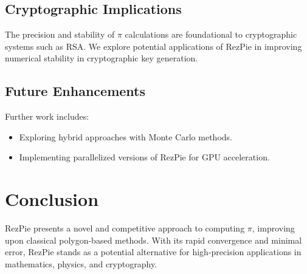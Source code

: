 \documentclass{article}
\begin{document}
\subsection{Cryptographic Implications}
The precision and stability of $\pi$ calculations are foundational to cryptographic systems such as RSA. We explore potential applications of RezPie in improving numerical stability in cryptographic key generation.

\subsection{Future Enhancements}
Further work includes:
\begin{itemize}
    \item Exploring hybrid approaches with Monte Carlo methods.
    \item Implementing parallelized versions of RezPie for GPU acceleration.
\end{itemize}

\section{Conclusion}
RezPie presents a novel and competitive approach to computing $\pi$, improving upon classical polygon-based methods. With its rapid convergence and minimal error, RezPie stands as a potential alternative for high-precision applications in mathematics, physics, and cryptography.
\end{document}
